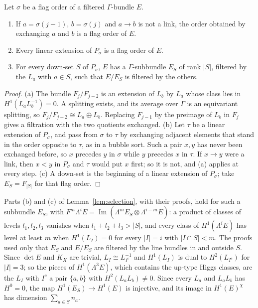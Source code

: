 \begin{lemma}\label{lem:exchange}
Let $\sigma$ be a flag order of a filtered $\Gamma$-bundle $E$.
\begin{enumerate}[label=\textup{(\alph*)},leftmargin=*,itemsep=1pt]
\item If $a=\sigma(j-1)$, $b=\sigma(j)$ and $a\to b$ is not a link, the
order obtained by exchanging $a$ and $b$ is a flag order of $E$.
\item Every linear extension of $P_\sigma$ is a flag order of $E$.
\item For every down-set $S$ of $P_\sigma$, $E$ has a $\Gamma$-subbundle
$E_S$ of rank $|S|$, filtered by the $L_a$ with $a\in S$, such that
$E/E_S$ is filtered by the others.
\end{enumerate}
\end{lemma}
\begin{proof}
(a) The bundle $F_j/F_{j-2}$ is an extension of $L_b$ by $L_a$ whose class
lies in $H^1(L_aL_b^{-1})=0$. A splitting exists, and its average over
$\Gamma$ is an equivariant splitting, so $F_j/F_{j-2}\cong L_a\oplus L_b$.
Replacing $F_{j-1}$ by the preimage of $L_b$ in $F_j$ gives a filtration
with the two quotients exchanged. (b) Let $\tau$ be a linear extension of
$P_\sigma$, and pass from $\sigma$ to $\tau$ by exchanging adjacent
elements that stand in the order opposite to $\tau$, as in a bubble sort.
Such a pair $x,y$ has never been exchanged before, so $x$ precedes $y$ in
$\sigma$ while $y$ precedes $x$ in $\tau$. If $x\to y$ were a link, then
$x<y$ in $P_\sigma$ and $\tau$ would put $x$ first; so it is not, and (a)
applies at every step. (c) A down-set is the beginning of a linear
extension of $P_\sigma$; take $E_S=F_{|S|}$ for that flag order.
\end{proof}

Parts (b) and (c) of Lemma~\ref{lem:selection}, with their proofs, hold
for such a subbundle $E_S$, with $F^m\Lambda^iE=\operatorname{Im}(\Lambda^mE_S\otimes
\Lambda^{i-m}E)$: a product of classes of levels $l_1,l_2,l_3$ vanishes
when $l_1+l_2+l_3>|S|$, and every class of $H^1(\Lambda^iE)$ has level at
least $m$ when $H^1(L_I)=0$ for every $|I|=i$ with $|I\cap S|<m$. The
proofs used only that $E_S$ and $E/E_S$ are filtered by the line bundles
in and outside $S$. Since $\det E$ and $K_X$ are trivial, $L_I\cong
L_{I^c}^{-1}$ and $H^1(L_I)$ is dual to $H^2(L_{I^c})$ for $|I|=3$; so the
pieces of $H^1(\Lambda^3E)$, which contains the up-type Higgs classes, are
the $L_I$ with $I^c$ a pair $\{a,b\}$ with $H^2(L_aL_b)\ne0$. Since every
$L_a$ and $L_aL_b$ has $H^0=0$, the map $H^1(E_S)\to H^1(E)$ is injective,
and its image in $H^1(E)^\chi$ has dimension $\sum_{a\in S}n_a$.

